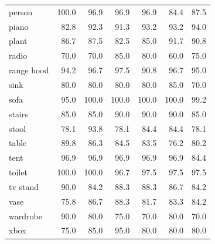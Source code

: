 {\begin{longtable}{lrrrrrr}
person & 100.0 & 96.9 & 96.9 & 96.9 & 84.4 & 87.5 \\
piano & 82.8 & 92.3 & 91.3 & 93.2 & 93.2 & 94.0 \\
plant & 86.7 & 87.5 & 82.5 & 85.0 & 91.7 & 90.8 \\
radio & 70.0 & 70.0 & 85.0 & 80.0 & 60.0 & 75.0 \\
range hood & 94.2 & 96.7 & 97.5 & 90.8 & 96.7 & 95.0 \\
sink & 80.0 & 80.0 & 80.0 & 80.0 & 85.0 & 70.0 \\
sofa & 95.0 & 100.0 & 100.0 & 100.0 & 100.0 & 99.2 \\
stairs & 85.0 & 85.0 & 90.0 & 90.0 & 90.0 & 85.0 \\
stool & 78.1 & 93.8 & 78.1 & 84.4 & 84.4 & 78.1 \\
table & 89.8 & 86.3 & 84.5 & 83.5 & 76.2 & 80.2 \\
tent & 96.9 & 96.9 & 96.9 & 96.9 & 96.9 & 84.4 \\
toilet & 100.0 & 100.0 & 96.7 & 97.5 & 97.5 & 97.5 \\
tv stand & 90.0 & 84.2 & 88.3 & 88.3 & 86.7 & 84.2 \\
vase & 75.8 & 86.7 & 88.3 & 81.7 & 83.3 & 84.2 \\
wardrobe & 90.0 & 80.0 & 75.0 & 70.0 & 80.0 & 70.0 \\
xbox & 75.0 & 85.0 & 95.0 & 80.0 & 80.0 & 80.0 \\
\end{longtable}}
